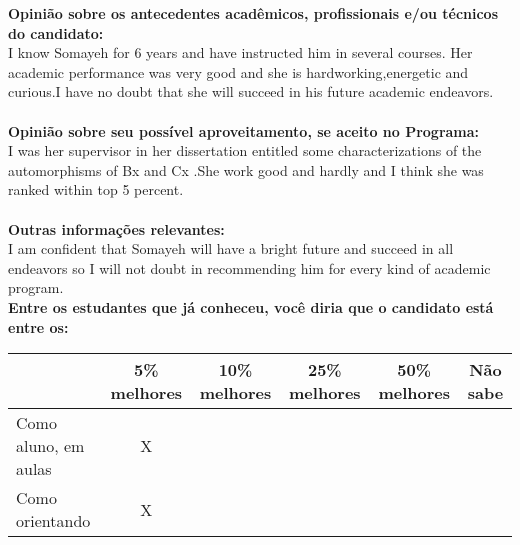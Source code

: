 \documentclass[11pt]{article}
\begin{document}
\textbf{Opinião sobre os antecedentes acadêmicos, profissionais e/ou técnicos do candidato:}
\\I know Somayeh for 6 years and have instructed him in several courses. Her academic performance was very good and she is hardworking,energetic and curious.I have no doubt that she will succeed in his future academic endeavors.\\
\\
\textbf{Opinião sobre seu possível aproveitamento, se aceito no Programa:}
\\I was her supervisor in her dissertation entitled some characterizations of the automorphisms of Bx and Cx .She work good and hardly and I think she was ranked within top 5 percent.\\ 
\\
\textbf{Outras informações relevantes:} \\I am confident that Somayeh will have a bright future and succeed in all endeavors so I will not doubt in recommending him for every kind of academic program.
\\[0.3cm]
\textbf{Entre os estudantes que já conheceu, você diria que o candidato está entre os:}
\\
\begin{tabular}{|l|c|c|c|c|c|}
\hline
 & 5\% melhores & 10\% melhores & 25\% melhores & 50\% melhores & Não sabe \\
\hline
Como aluno, em aulas & X &  &  &  & \\
\hline
Como orientando & X &  &  &  & \\
\hline
\end{tabular}
\end{document}

